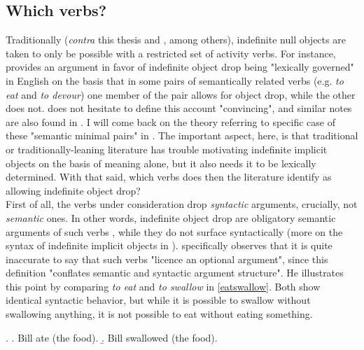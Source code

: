 
\subsection{Which verbs?} 

Traditionally (\textit{contra} this thesis and \textcite[55]{TonelliDelmonte2011}, among others), indefinite null objects are taken to only be possible with a restricted set of activity verbs. For instance, \textcite[510]{Rizzi1986} provides an argument in favor of indefinite object drop being "lexically governed" in English on the basis that in some pairs of semantically related verbs (e.g. \textit{to eat} and \textit{to devour}) one member of the pair allows for object drop, while the other does not. \textcite[236]{Haegeman1987} does not hesitate to define this account "convincing", and similar notes are also found in \textcite{Fillmore1986, Rice1988, Mittwoch2005, Gillon2012}. I will come back on the theory referring to specific case of these "semantic minimal pairs" in . The important aspect, here, is that traditional or traditionally-leaning literature has trouble motivating indefinite implicit objects on the basis of meaning alone, but it also needs it to be lexically determined. With that said, which verbs does then the literature identify as allowing indefinite object drop?\\
First of all, the verbs under consideration drop \textit{syntactic} arguments, crucially, not \textit{semantic} ones. In other words, indefinite object drop are obligatory semantic arguments of such verbs \parencite[120]{Cote1996}, while they do not surface syntactically (more on the syntax of indefinite implicit objects in ). \textcite[134]{Jackendoff2003} specifically observes that it is quite inaccurate to say that such verbs "licence an optional argument", since this definition "conflates semantic and syntactic argument structure". He illustrates this point by comparing \textit{to eat} and \textit{to swallow} in \ref{eatswallow}. Both show identical syntactic behavior, but while it is possible to swallow without swallowing anything, it is not possible to eat without eating something.

\ex. \label{eatswallow} \a. \label{eatswallow1} Bill ate (the food).
\b. \label{eatswallow2} Bill swallowed (the food).

